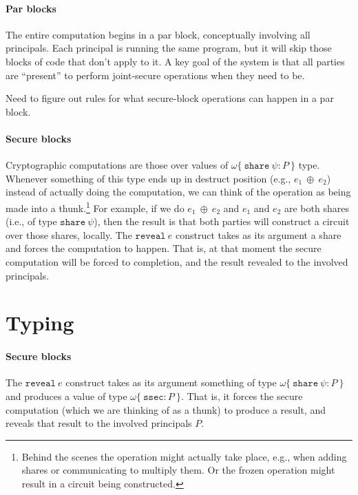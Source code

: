 \documentclass[10pt]{article}
\newcommand{\kw}[1]{\ensuremath{\mathtt{#1}}}
\newcommand{\ssec}{\ensuremath{\mathtt{ssec}}}
\newcommand{\sshare}[1]{\ensuremath{\mathtt{share}~{#1}}}
\newcommand{\sectyp}[3]{\ensuremath{{#1} \{~{#2}:{#3}~\}}}
\newcommand{\ebinop}[2]{\ensuremath{{#1}~\oplus~{#2}}}
\newcommand{\ereveal}[1]{\ensuremath{\kw{reveal}~{#1}}}
\begin{document}
\paragraph*{Par blocks}

The entire computation begins in a par block, conceptually involving
all principals. Each principal is running the same program, but it
will skip those blocks of code that don't apply to it.  A key goal of
the system is that all parties are ``present'' to perform joint-secure
operations when they need to be.

Need to figure out rules for what secure-block operations can happen
in a par block.

\paragraph*{Secure blocks}

Cryptographic computations are those over values of
$\sectyp{\omega}{\sshare{\psi}}{P}$ type. Whenever something of this
type ends up in destruct position (e.g., $\ebinop{e_1}{e_2}$) instead
of actually doing the computation, we can think of the operation as
being made into a thunk.\footnote{Behind the scenes the operation might
actually take place, e.g., when adding shares or communicating to
multiply them. Or the frozen operation might result in a circuit being
constructed.} For example, if we do $\ebinop{e_1}{e_2}$ and $e_1$ and
$e_2$ are both shares (i.e., of type $\sshare{\psi}$), then the result
is that both parties will construct a circuit over those shares,
locally. The $\ereveal{e}$ construct takes as its argument a share and
forces the computation to happen. That is, at that moment the secure
computation will be forced to completion, and the result revealed to
the involved principals.

\section{Typing}

\paragraph*{Secure blocks}

The $\ereveal{e}$ construct takes as its argument something of type
$\sectyp{\omega}{\sshare{\psi}}{P}$ and produces a value of type
$\sectyp{\omega}{\ssec}{P}$. That is, it forces the secure computation
(which we are thinking of as a thunk) to produce a result, and reveals
that result to the involved principals $P$.
\end{document}
